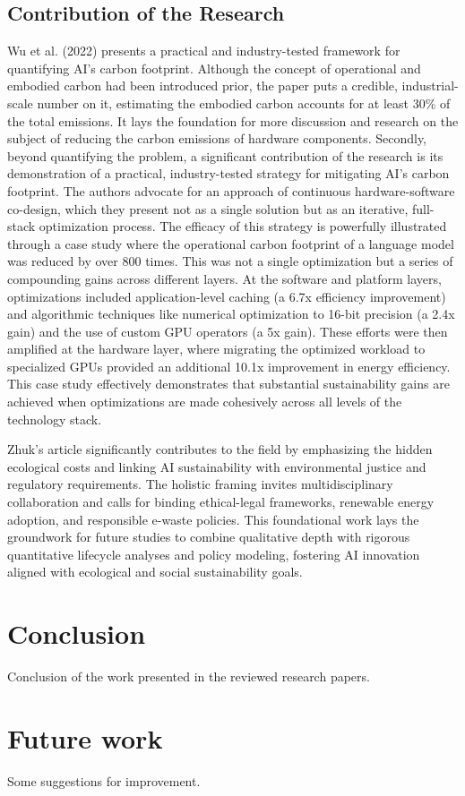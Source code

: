 \documentclass[a4paper, 12pt]{article}
\begin{document}
\subsection{Contribution of the Research}
\hspace{24pt}Wu et al. (2022) presents a practical and industry-tested framework for quantifying AI's carbon footprint. Although the concept of operational and embodied carbon had been introduced prior, the paper puts a credible, industrial-scale number on it, estimating the embodied carbon accounts for at least 30\% of the total emissions. It lays the foundation for more discussion and research on the subject of reducing the carbon emissions of hardware components. Secondly, beyond quantifying the problem, a significant contribution of the research is its demonstration of a practical, industry-tested strategy for mitigating AI's carbon footprint. The authors advocate for an approach of continuous hardware-software co-design, which they present not as a single solution but as an iterative, full-stack optimization process. The efficacy of this strategy is powerfully illustrated through a case study where the operational carbon footprint of a language model was reduced by over 800 times. This was not a single optimization but a series of compounding gains across different layers. At the software and platform layers, optimizations included application-level caching (a 6.7x efficiency improvement) and algorithmic techniques like numerical optimization to 16-bit precision (a 2.4x gain) and the use of custom GPU operators (a 5x gain). These efforts were then amplified at the hardware layer, where migrating the optimized workload to specialized GPUs provided an additional 10.1x improvement in energy efficiency. This case study effectively demonstrates that substantial sustainability gains are achieved when optimizations are made cohesively across all levels of the technology stack.

\hspace{24pt} Zhuk's article significantly contributes to the field by emphasizing the hidden ecological costs and linking AI sustainability with environmental justice and regulatory requirements. The holistic framing invites multidisciplinary collaboration and calls for binding ethical-legal frameworks, renewable energy adoption, and responsible e-waste policies. This foundational work lays the groundwork for future studies to combine qualitative depth with rigorous quantitative lifecycle analyses and policy modeling, fostering AI innovation aligned with ecological and social sustainability goals.

\section{Conclusion}
Conclusion of the work presented in the reviewed research papers.

\section{Future work}
Some suggestions for improvement.


{}
\end{document}
